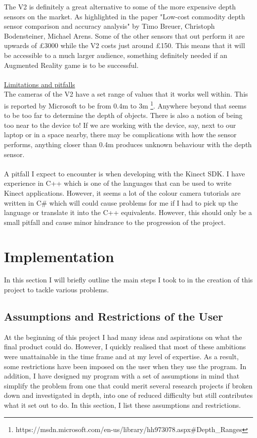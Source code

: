 \documentclass[11pt]{article}
\begin{document}
The V2 is definitely a great alternative to some of the more expensive depth 
sensors on the market. As highlighted in the paper
"Low-cost commodity depth sensor comparison and accuracy analysis" by
Timo Breuer, Christoph Bodensteiner, Michael Arens. Some of the other sensors
that out perform it are upwards of £3000 while the V2 costs just around £150.
This means that it will be accessible to a much larger audience, something
definitely needed if an Augmented Reality game is to be successful.
\\ \\
\underline{Limitations and pitfalls}\\
The cameras of the V2 have a set range of values that it works well within.
This is reported by Microsoft to be from 0.4m to 3m
\footnote{https://msdn.microsoft.com/en-us/library/hh973078.aspx\#Depth\_Ranges}.
Anywhere beyond that seems to be too
far to determine the depth of objects. There is also a notion of being too near
to the device to! If we are working with the device, say, next to our laptop or
in a space nearby, there may be complications with how the sensor performs, 
anything closer than 0.4m produces unknown behaviour with the depth sensor.
\\ \\
A pitfall I expect to encounter is when developing with the Kinect SDK. I have
experience in C++ which is one of the languages that can be used to write Kinect 
applications. However, it seems a lot of the colour camera tutorials are written
in C\# which will could cause problems for me if I had to pick up the language 
or translate it into the C++ equivalents. However, this should only be a small
pitfall and cause minor hindrance to the progression of the project.

\newpage

\section{Implementation}
In this section I will briefly outline the main steps I took to in
the creation of this project to tackle various problems.
\subsection{Assumptions and Restrictions of the User}
\label{sec:assumptions}
At the beginning of this project I had many ideas and aspirations on
what the final product could do. However, I quickly realised that most
of these ambitions were unattainable in the time frame and at my level
of expertise. As a result, some restrictions have been imposed on the
user when they use the program. In addition, I have designed my
program with a set of assumptions in mind that simplify the problem from
one that could merit several research projects if broken down and 
investigated in depth, into one of reduced difficulty but still 
contributes what it set out to do. In this section, I list these
assumptions and restrictions. 
\end{document}
